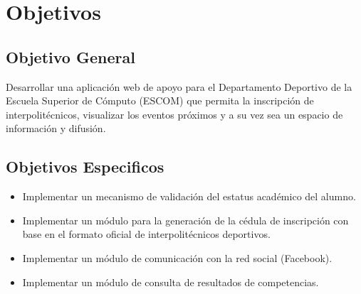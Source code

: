 	\section{Objetivos}
	\subsection{Objetivo General}
	\noindent Desarrollar una aplicación web de apoyo para el Departamento Deportivo de la Escuela Superior de Cómputo (ESCOM) que permita la inscripción de interpolitécnicos, visualizar los eventos próximos y a su vez sea un espacio de información y difusión.
	\subsection{Objetivos Especificos}
	\begin{itemize}
		\item Implementar un mecanismo de validación del estatus académico del alumno. 
		\item Implementar un módulo para la generación de la cédula de inscripción con base en el formato oficial de interpolitécnicos deportivos. 
		\item Implementar un módulo de comunicación con la red social (Facebook). 
		\item Implementar un módulo de consulta de resultados de competencias.
	\end{itemize}